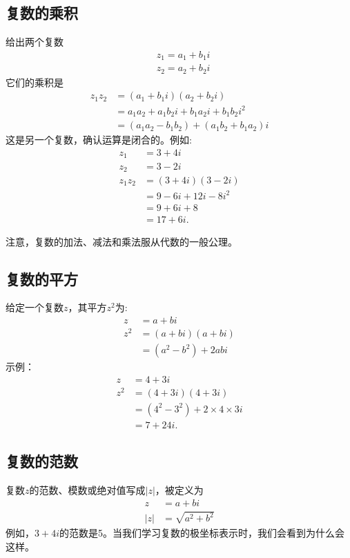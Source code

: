 \subsection{复数的乘积}
给出两个复数
$$
\begin{aligned}
& z_{1}=a_{1}+b_{1} i \\
& z_{2}=a_{2}+b_{2} i
\end{aligned}
$$
它们的乘积是
$$
\begin{aligned}
z_{1} z_{2} & =\left(a_{1}+b_{1} i\right)\left(a_{2}+b_{2} i\right) \\
& =a_{1} a_{2}+a_{1} b_{2} i+b_{1} a_{2} i+b_{1} b_{2} i^{2} \\
& =\left(a_{1} a_{2}-b_{1} b_{2}\right)+\left(a_{1} b_{2}+b_{1} a_{2}\right) i
\end{aligned}
$$
这是另一个复数，确认运算是闭合的。例如:
$$
\begin{aligned}
z_{1} & =3+4 i \\
z_{2} & =3-2 i \\
z_{1} z_{2} & =(3+4 i)(3-2 i) \\
& =9-6 i+12 i-8 i^{2} \\
& =9+6 i+8 \\
& =17+6 i .
\end{aligned}
$$

注意，复数的加法、减法和乘法服从代数的一般公理。

\subsection{复数的平方}
给定一个复数$z$，其平方$z^{2}$为:
$$
\begin{aligned}
z & =a+b i \\
z^{2} & =(a+b i)(a+b i) \\
& =\left(a^{2}-b^{2}\right)+2 a b i
\end{aligned}
$$
示例：
$$
\begin{aligned}
z & =4+3 i \\
z^{2} & =(4+3 i)(4+3 i) \\
& =\left(4^{2}-3^{2}\right)+2 \times 4 \times 3 i \\
& =7+24 i .
\end{aligned}
$$

\subsection{复数的范数}
复数$z$的范数、模数或绝对值写成$|z|$，被定义为
$$
\begin{aligned}
z & =a+b i \\
|z| & =\sqrt{a^{2}+b^{2}}
\end{aligned}
$$
例如，$3+ 4i $的范数是5。当我们学习复数的极坐标表示时，我们会看到为什么会这样。

